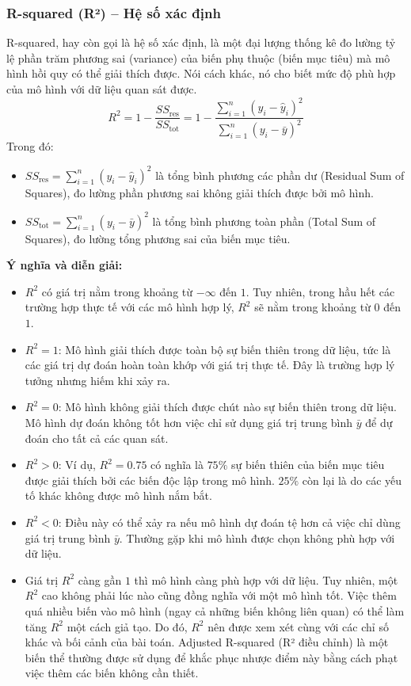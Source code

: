 \subsubsection{R-squared (R²) – Hệ số xác định}
\label{subsubsec:r_squared_explanation}
R-squared, hay còn gọi là hệ số xác định, là một đại lượng thống kê đo lường tỷ lệ phần trăm phương sai (variance) của biến phụ thuộc (biến mục tiêu) mà mô hình hồi quy có thể giải thích được. Nói cách khác, nó cho biết mức độ phù hợp của mô hình với dữ liệu quan sát được.
\begin{equation}
    R^2 = 1 - \frac{SS_{\text{res}}}{SS_{\text{tot}}} = 1 - \frac{\sum_{i=1}^{n} (y_i - \hat{y}_i)^2}{\sum_{i=1}^{n} (y_i - \bar{y})^2}
    \label{eq:r_squared}
\end{equation}
Trong đó:
\begin{itemize}
    \item $SS_{\text{res}} = \sum_{i=1}^{n} (y_i - \hat{y}_i)^2$ là tổng bình phương các phần dư (Residual Sum of Squares), đo lường phần phương sai không giải thích được bởi mô hình.
    \item $SS_{\text{tot}} = \sum_{i=1}^{n} (y_i - \bar{y})^2$ là tổng bình phương toàn phần (Total Sum of Squares), đo lường tổng phương sai của biến mục tiêu.
\end{itemize}
\textbf{Ý nghĩa và diễn giải:}
\begin{itemize}
    \item $R^2$ có giá trị nằm trong khoảng từ $-\infty$ đến $1$. Tuy nhiên, trong hầu hết các trường hợp thực tế với các mô hình hợp lý, $R^2$ sẽ nằm trong khoảng từ $0$ đến $1$.
    \item $R^2 = 1$: Mô hình giải thích được toàn bộ sự biến thiên trong dữ liệu, tức là các giá trị dự đoán hoàn toàn khớp với giá trị thực tế. Đây là trường hợp lý tưởng nhưng hiếm khi xảy ra.
    \item $R^2 = 0$: Mô hình không giải thích được chút nào sự biến thiên trong dữ liệu. Mô hình dự đoán không tốt hơn việc chỉ sử dụng giá trị trung bình $\bar{y}$ để dự đoán cho tất cả các quan sát.
    \item $R^2 > 0$: Ví dụ, $R^2 = 0.75$ có nghĩa là $75\%$ sự biến thiên của biến mục tiêu được giải thích bởi các biến độc lập trong mô hình. $25\%$ còn lại là do các yếu tố khác không được mô hình nắm bắt.
    \item $R^2 < 0$: Điều này có thể xảy ra nếu mô hình dự đoán tệ hơn cả việc chỉ dùng giá trị trung bình $\bar{y}$. Thường gặp khi mô hình được chọn không phù hợp với dữ liệu.
    \item Giá trị $R^2$ càng gần $1$ thì mô hình càng phù hợp với dữ liệu. Tuy nhiên, một $R^2$ cao không phải lúc nào cũng đồng nghĩa với một mô hình tốt. Việc thêm quá nhiều biến vào mô hình (ngay cả những biến không liên quan) có thể làm tăng $R^2$ một cách giả tạo. Do đó, $R^2$ nên được xem xét cùng với các chỉ số khác và bối cảnh của bài toán. Adjusted R-squared (R² điều chỉnh) là một biến thể thường được sử dụng để khắc phục nhược điểm này bằng cách phạt việc thêm các biến không cần thiết.
\end{itemize}


